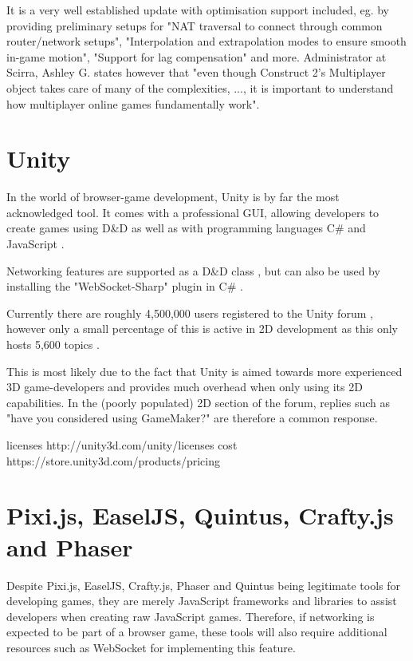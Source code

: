 \documentclass[bsc,frontabs,twoside,singlespacing,parskip,deptreport]{infthesis}     %
\begin{document}
It is a very well established update with optimisation support included, eg. by providing preliminary setups for "NAT traversal to connect through common router/network setups", "Interpolation and extrapolation modes to ensure smooth in-game motion", "Support for lag compensation" and more. Administrator at Scirra, Ashley G. states however that "even though Construct 2's Multiplayer object takes care of many of the complexities, ..., it is important to understand how multiplayer online games fundamentally work"\cite{Construct2_Multiplayer_Tutorial}.


\section{Unity}
In the world of browser-game development, Unity is by far the most acknowledged tool. It comes with a professional GUI, allowing developers to create games using D\&D as well as with programming languages C\# and JavaScript \cite{unity_support}.

Networking features are supported as a D\&D class \cite{unity_networking}, but can also be used by installing the "WebSocket-Sharp" plugin in C\# \cite{unity_websocket_sharp}.

Currently there are roughly 4,500,000 users registered \cite{unity_stats} to the Unity forum \cite{unity_forum}, however only a small percentage of this is active in 2D development as this only hosts 5,600 topics \cite{unity_forum_2d}. 

This is most likely due to the fact that Unity is aimed towards more experienced 3D game-developers and provides much overhead when only using its 2D capabilities. In the (poorly populated) 2D section of the forum, replies such as "have you considered using GameMaker?" \cite{unity_suggests_gamemaker} are therefore a common response.

licenses http://unity3d.com/unity/licenses
cost https://store.unity3d.com/products/pricing

\section{Pixi.js, EaselJS, Quintus, Crafty.js and Phaser}
Despite Pixi.js, EaselJS, Crafty.js, Phaser and Quintus being legitimate tools for developing games, they are merely JavaScript frameworks and libraries to assist developers when creating raw JavaScript games. Therefore, if networking is expected to be part of a browser game, these tools will also require additional resources such as WebSocket for implementing this feature.
\end{document}
